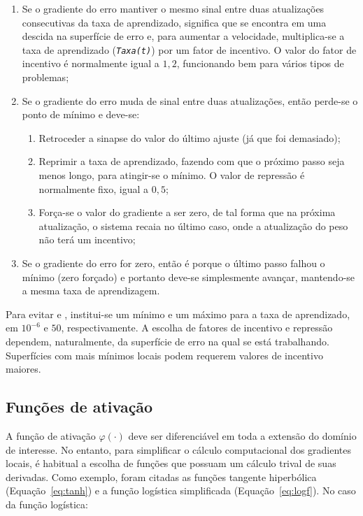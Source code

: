 \begin{enumerate}
\item Se o gradiente do erro mantiver o mesmo sinal entre duas
atualizações consecutivas da taxa de aprendizado, significa que se encontra em
uma descida na superfície de erro e, para aumentar a velocidade,
multiplica-se a taxa de aprendizado (\texttt{\textit{Taxa(t)}}) por um fator
de incentivo. O valor do fator de incentivo é normalmente igual a $1,2$,
funcionando bem para vários tipos de problemas;
\item Se o gradiente do erro muda de sinal entre duas atualizações, então
perde-se o ponto de mínimo e deve-se:
\begin{enumerate}
\item Retroceder a sinapse do valor do último ajuste (já que foi demasiado);
\item Reprimir a taxa de aprendizado, fazendo com que o próximo passo seja
menos longo, para atingir-se o mínimo. O valor de repressão é normalmente
fixo, igual a $0,5$;
\item Força-se o valor do gradiente a ser zero, de tal forma que na próxima
atualização, o sistema recaia no último caso, onde a atualização do peso não
terá um incentivo;
\end{enumerate}
\item Se o gradiente do erro for zero, então é porque o último passo falhou
o mínimo (zero forçado) e portanto deve-se simplesmente avançar, mantendo-se a
mesma taxa de aprendizagem.
\end{enumerate}

Para evitar  e , institui-se um mínimo e um
máximo para a taxa de aprendizado, em $10^{-6}$ e $50$, respectivamente. A
escolha de fatores de incentivo e repressão dependem, naturalmente, da
superfície de erro na qual se está trabalhando. Superfícies com mais mínimos
locais podem requerem valores de incentivo maiores.

\subsection{Funções de ativação} 

A função de ativação $\varphi(\cdot)$ deve ser diferenciável em toda a
extensão do domínio de interesse. No entanto, para simplificar o cálculo
computacional dos gradientes locais, é habitual a escolha de funções que
possuam um cálculo trival de suas derivadas. Como exemplo, foram citadas as
funções tangente hiperbólica (Equação~\ref{eq:tanh}) e a função logística
simplificada (Equação~\ref{eq:logf}). No caso da função logística:

